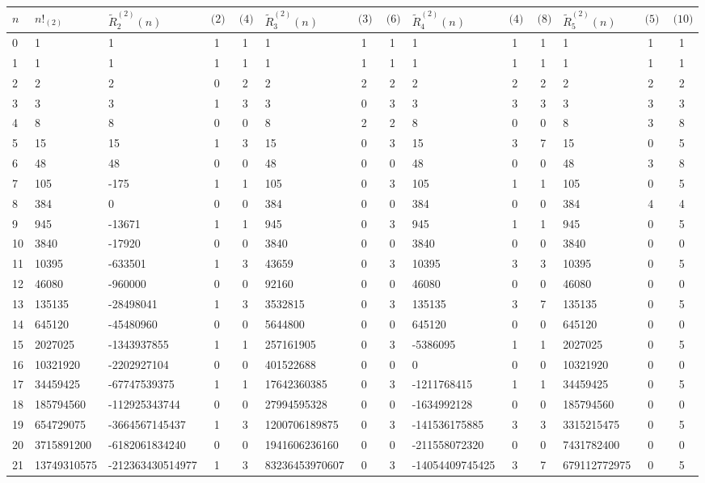 \documentclass[12pt,reqno]{article}
\numberwithin{sfootnote}{section}
\newcommand{\tabletopstrut}[0]{\rule{0pt}{3ex}}
\numberwithin{equation}{section}
\theoremstyle{DefaultTheoremStyle}
\theoremstyle{definition}
\newcommand{\MultiFactorial}[2]{\ensuremath{#1!_{\left(#2\right)}}}
\begin{document}
\begin{sidewaystable} 
\centering 
\smaller 

\begin{tabular}{|l|l|lcc|lcc|lcc|lcc|} \hline 
\hline\tabletopstrut 
$n$ & $\MultiFactorial{n}{2}$ & 
$\widetilde{R}_2^{(2)}(n)$ & $\pod{2}$ & $\pod{4}$ &
$\widetilde{R}_3^{(2)}(n)$ & $\pod{3}$ & $\pod{6}$ &
$\widetilde{R}_4^{(2)}(n)$ & $\pod{4}$ & $\pod{8}$ &
$\widetilde{R}_5^{(2)}(n)$ & $\pod{5}$ & $\pod{10}$ \\ \hline 
 0 & 1 & 1 & 1 & 1 & 1 & 1 & 1 & 1 & 1 & 1 & 1 & 1 & 1 \\
 1 & 1 & 1 & 1 & 1 & 1 & 1 & 1 & 1 & 1 & 1 & 1 & 1 & 1 \\
 2 & 2 & 2 & 0 & 2 & 2 & 2 & 2 & 2 & 2 & 2 & 2 & 2 & 2 \\
 3 & 3 & 3 & 1 & 3 & 3 & 0 & 3 & 3 & 3 & 3 & 3 & 3 & 3 \\
 4 & 8 & 8 & 0 & 0 & 8 & 2 & 2 & 8 & 0 & 0 & 8 & 3 & 8 \\
 5 & 15 & 15 & 1 & 3 & 15 & 0 & 3 & 15 & 3 & 7 & 15 & 0 & 5 \\
 6 & 48 & 48 & 0 & 0 & 48 & 0 & 0 & 48 & 0 & 0 & 48 & 3 & 8 \\
 7 & 105 & -175 & 1 & 1 & 105 & 0 & 3 & 105 & 1 & 1 & 105 & 0 & 5 \\
 8 & 384 & 0 & 0 & 0 & 384 & 0 & 0 & 384 & 0 & 0 & 384 & 4 & 4 \\
 9 & 945 & -13671 & 1 & 1 & 945 & 0 & 3 & 945 & 1 & 1 & 945 & 0 & 5 \\
 10 & 3840 & -17920 & 0 & 0 & 3840 & 0 & 0 & 3840 & 0 & 0 & 3840 & 0 & 0 \\
 11 & 10395 & -633501 & 1 & 3 & 43659 & 0 & 3 & 10395 & 3 & 3 & 10395 & 0 & 5 \\
 12 & 46080 & -960000 & 0 & 0 & 92160 & 0 & 0 & 46080 & 0 & 0 & 46080 & 0 & 0 \\
 13 & 135135 & -28498041 & 1 & 3 & 3532815 & 0 & 3 & 135135 & 3 & 7 & 135135 & 0 & 5 \\
 14 & 645120 & -45480960 & 0 & 0 & 5644800 & 0 & 0 & 645120 & 0 & 0 & 645120 & 0 & 0 \\
 15 & 2027025 & -1343937855 & 1 & 1 & 257161905 & 0 & 3 & -5386095 & 1 & 1 & 2027025 & 0 & 5 \\
 16 & 10321920 & -2202927104 & 0 & 0 & 401522688 & 0 & 0 & 0 & 0 & 0 & 10321920 & 0 & 0 \\
 17 & 34459425 & -67747539375 & 1 & 1 & 17642360385 & 0 & 3 & -1211768415 & 1 & 1 & 34459425 & 0 & 5 \\
 18 & 185794560 & -112925343744 & 0 & 0 & 27994595328 & 0 & 0 & -1634992128 & 0 & 0 & 185794560 & 0 & 0 \\
 19 & 654729075 & -3664567145437 & 1 & 3 & 1200706189875 & 0 & 3 & -141536175885 & 3 & 3 & 3315215475 & 0 & 5 \\
 20 & 3715891200 & -6182061834240 & 0 & 0 & 1941606236160 & 0 & 0 & -211558072320 & 0 & 0 & 7431782400 & 0 & 0 \\
 21 & 13749310575 & -212363430514977 & 1 & 3 & 83236453970607 & 0 & 3 & -14054409745425 & 3 & 7 & 679112772975 & 0 & 5 \\
\hline\hline
\end{tabular} 


\end{sidewaystable}
\end{document}
